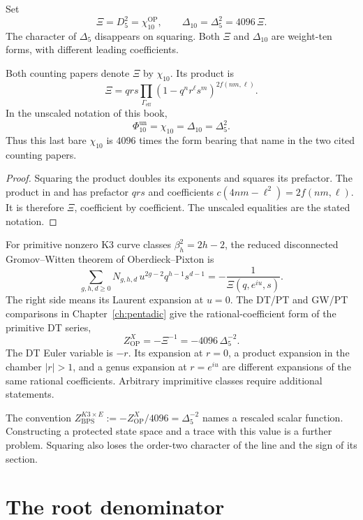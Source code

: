 Set
\[
 \Xi=D_5^2=\chi_{10}^{\mathrm{OP}},\qquad
 \Delta_{10}=\Delta_5^2=4096\,\Xi.
\]
The character of \(\Delta_5\) disappears on squaring.
Both \(\Xi\) and \(\Delta_{10}\) are weight-ten forms, with
different leading coefficients.

\begin{proposition}
\label{prop:view1-square-chi-10}
Both counting papers \cite{OPand,OB} denote \(\Xi\) by
\(\chi_{10}\).  Its product is
\[
 \Xi=qrs\prod_{\Gamma_{\mathrm{eff}}}
                  (1-q^nr^\ell s^m)^{2f(nm,\ell)}.
\]
In the unscaled notation of this book,
\[
 \Phi_{10}^{\mathrm{un}}=\chi_{10}=\Delta_{10}=\Delta_5^2.
\]
Thus this last bare \(\chi_{10}\) is \(4096\) times the form
bearing that name in the two cited counting papers.
\end{proposition}

\begin{proof}
Squaring the product doubles its exponents and squares its
prefactor.  The product in \cite[(12)]{OPand} and
\cite[(3)]{OB} has prefactor \(qrs\) and coefficients
\(c(4nm-\ell^2)=2f(nm,\ell)\).
It is therefore \(\Xi\), coefficient by coefficient.
The unscaled equalities are the stated notation.
\end{proof}

For primitive nonzero K3 curve classes
\(\beta_h^2=2h-2\), the reduced disconnected Gromov--Witten theorem
of Oberdieck--Pixton \cite[Theorem 1]{OB} is
\[
 \sum_{g,h,d\geq0}N_{g,h,d}\,u^{2g-2}q^{h-1}s^{d-1}
 =-\frac1{\Xi(q,e^{iu},s)}.
\]
The right side means its Laurent expansion at \(u=0\).
The DT/PT and GW/PT comparisons in Chapter~\ref{ch:pentadic}
give the rational-coefficient form of the primitive DT series,
\[
 Z_{\mathrm{OP}}^X=-\Xi^{-1}=-4096\,\Delta_5^{-2}.
\]
The DT Euler variable is \(-r\).  Its expansion at \(r=0\), a
product expansion in the chamber \(|r|>1\), and a genus expansion
at \(r=e^{iu}\) are different expansions of the same rational
coefficients.  Arbitrary imprimitive classes require additional
statements.

The convention
\(Z_{\mathrm{BPS}}^{K3\times E}:=-Z_{\mathrm{OP}}^X/4096
=\Delta_5^{-2}\) names a rescaled scalar function.
Constructing a protected state space and a trace with this value is
a further problem.  Squaring also loses the order-two character of
the line and the sign of its section.

\section{The root denominator}
\label{sec:view1-2Z-denominator}

